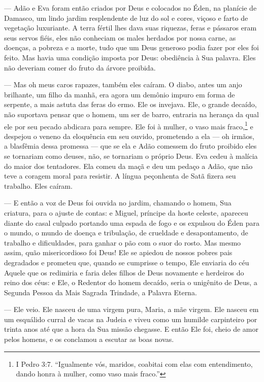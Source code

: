  --- Adão e Eva foram então criados por Deus e colocados no Éden, na
planície de Damasco, um lindo jardim resplendente de luz do sol e
cores, viçoso e farto de vegetação luxuriante. A terra fértil lhes dava
suas riquezas, feras e pássaros eram seus servos fiéis, eles não
conheciam os males herdados por nossa carne, as doenças, a pobreza e a
morte, tudo que um Deus generoso podia fazer por eles foi feito. Mas
havia uma condição imposta por Deus: obediência à Sua palavra. Eles não
deveriam comer do fruto da árvore proibida.

 --- Mas oh meus caros rapazes, também eles caíram. O diabo, antes um anjo
brilhante, um filho da manhã, era agora um demônio impuro em forma de
serpente, a mais astuta das feras do ermo. Ele os invejava. Ele, o
grande decaído, não suportava pensar que o homem, um ser de barro,
entraria na herança da qual ele por seu pecado abdicara para sempre.
Ele foi à mulher, o vaso mais fraco,\footnote{ I Pedro 3:7. “Igualmente
vós, maridos, coabitai com elas com entendimento, dando honra à mulher,
como vaso mais fraco.”} e despejou o veneno da eloquência em seu
ouvido, prometendo a ela --- oh irmãos, a blasfêmia dessa promessa --- que
se ela e Adão comessem do fruto proibido eles se tornariam como deuses,
não, se tornariam o próprio Deus. Eva cedeu à malícia do maior dos
tentadores. Ela comeu da maçã e deu um pedaço a Adão, que não teve a
coragem moral para resistir. A língua peçonhenta de Satã fizera seu
trabalho. Eles caíram.

 --- E então a voz de Deus foi ouvida no jardim, chamando o homem, Sua
criatura, para o ajuste de contas: e Miguel, príncipe da hoste celeste,
apareceu diante  do casal culpado portando uma espada de fogo e os
expulsou do Éden para o mundo, o mundo de doença e tribulação, de
crueldade e desapontamento, de trabalho e dificuldades, para ganhar o
pão com o suor do rosto. Mas mesmo assim, quão misericordioso foi Deus!
Ele se apiedou de nossos pobres pais degradados e prometeu que, quando
se cumprisse o tempo, Ele enviaria do céu Aquele que os redimiria e
faria deles filhos de Deus novamente e herdeiros do reino dos céus: e
Ele, o Redentor do homem decaído, seria o unigênito de Deus, a Segunda
Pessoa da Mais Sagrada Trindade, a Palavra Eterna.

 --- Ele veio. Ele nasceu de uma virgem pura, Maria, a mãe virgem. Ele
nasceu em um esquálido curral de vacas na Judeia e viveu como um
humilde carpinteiro por trinta anos até que a hora da Sua missão
chegasse. E então Ele foi, cheio de amor pelos homens, e os conclamou a
escutar as boas novas.

